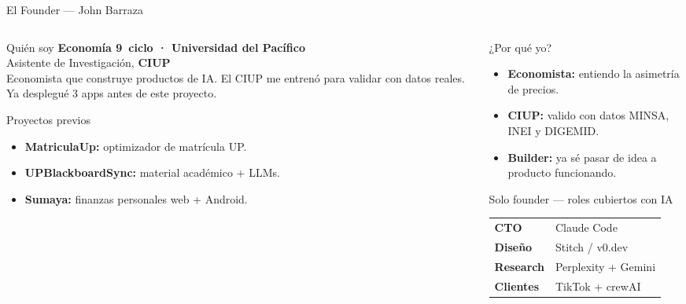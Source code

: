 \documentclass[aspectratio=169,11pt]{beamer}
\newcommand{\tightlist}{\setlength\itemsep{2pt}\setlength\parskip{0pt}\setlength\parsep{0pt}}
\begin{document}
\begin{frame}[t]{El Founder — John Barraza}
\vspace{-0.2em}
\begin{columns}[T,onlytextwidth]
\begin{column}{0.49\textwidth}
\begin{block}{Quién soy}
\textbf{Economía 9\textdegree\ ciclo · Universidad del Pacífico}\\
Asistente de Investigación, \textbf{CIUP}\\[0.25em]
Economista que construye productos de IA. El CIUP me entrenó para validar con datos reales. Ya desplegué 3 apps antes de este proyecto.
\end{block}
\vspace{0.25em}
\begin{block}{Proyectos previos}
\begin{itemize}\tightlist
  \item \textbf{MatriculaUp:} optimizador de matrícula UP.
  \item \textbf{UPBlackboardSync:} material académico + LLMs.
  \item \textbf{Sumaya:} finanzas personales web + Android.
\end{itemize}
\end{block}
\end{column}
\begin{column}{0.49\textwidth}
\begin{block}{¿Por qué yo?}
\begin{itemize}\tightlist
  \item \textbf{Economista:} entiendo la asimetría de precios.
  \item \textbf{CIUP:} valido con datos MINSA, INEI y DIGEMID.
  \item \textbf{Builder:} ya sé pasar de idea a producto funcionando.
\end{itemize}
\end{block}
\vspace{0.25em}
\begin{alertblock}{Solo founder — roles cubiertos con IA}
\begin{tabularx}{\linewidth}{@{}lX@{}}
\textbf{CTO}      & Claude Code \\
\textbf{Diseño}   & Stitch / v0.dev \\
\textbf{Research} & Perplexity + Gemini \\
\textbf{Clientes} & TikTok + crewAI \\
\end{tabularx}
\end{alertblock}
\end{column}
\end{columns}
\end{frame}
\end{document}
